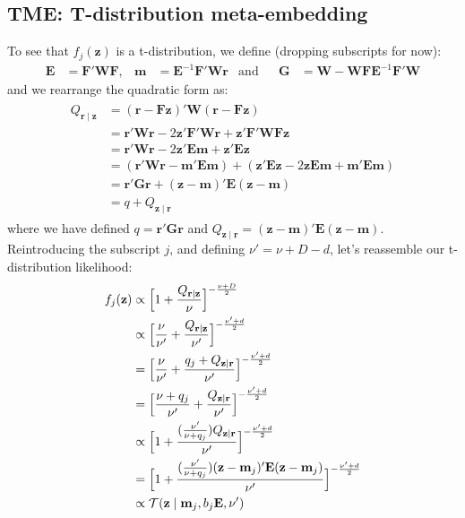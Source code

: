 \documentclass[a4paper,oneside,12pt,english]{report}
\def\zvec{\mathbf{z}}
\def\Wmat{\mathbf{W}}
\def\Fmat{\mathbf{F}}
\def\Gmat{\mathbf{G}}
\def\Emat{\mathbf{E}}
\def\Gmat{\mathbf{G}}
\def\mvec{\mathbf{m}}
\def\rvec{\mathbf{r}}
\begin{document}
\subsection{TME: T-distribution meta-embedding}
To see that $f_j(\zvec)$ is a t-distribution, we define (dropping subscripts for now): 
\begin{align}
\label{eq:defBmuG}
\Emat &= \Fmat'\Wmat\Fmat,& \mvec &= \Emat^{-1}\Fmat'\Wmat\rvec& \text{and} && \Gmat &= \Wmat-\Wmat\Fmat\Emat^{-1}\Fmat'\Wmat 
\end{align}
and we rearrange the quadratic form as:
\begin{align}
\label{eq:rearrangeQ}
\begin{split}
Q_{\rvec\mid\zvec} &= (\rvec-\Fmat\zvec)'\Wmat(\rvec-\Fmat\zvec)\\ 
&= \rvec'\Wmat\rvec -2\zvec'\Fmat'\Wmat\rvec + \zvec'\Fmat'\Wmat\Fmat\zvec \\
&= \rvec'\Wmat\rvec -2\zvec'\Emat\mvec + \zvec'\Emat\zvec \\
&= (\rvec'\Wmat\rvec -\mvec'\Emat\mvec) + (\zvec'\Emat\zvec -2\zvec\Emat\mvec + \mvec'\Emat\mvec) \\
&= \rvec'\Gmat\rvec + (\zvec-\mvec)'\Emat(\zvec-\mvec) \\
&= q + Q_{\zvec\mid\rvec}
\end{split}
\end{align}
where we have defined $q=\rvec'\Gmat\rvec$ and $Q_{\zvec\mid\rvec}=(\zvec-\mvec)'\Emat(\zvec-\mvec)$. Reintroducing the subscript $j$, and defining $\nu'=\nu+D-d$, let's reassemble our t-distribution likelihood:
\begin{align}
\label{eq:TME}
\begin{split}
f_j(\zvec) &\propto \Bigl[1+\frac{Q_{\rvec\mid\zvec}}{\nu}\Bigr]^{-\frac{\nu+D}{2}} \\
&\propto\Bigl[\frac{\nu}{\nu'}+\frac{Q_{\rvec\mid\zvec}}{\nu'}\Bigr]^{-\frac{\nu'+d}{2}} \\
&= \Bigl[\frac{\nu}{\nu'}+\frac{q_j + Q_{\zvec\mid\rvec}}{\nu'}\Bigr]^{-\frac{\nu'+d}{2}} \\
&= \Bigl[\frac{\nu+q_j}{\nu'} + \frac{Q_{\zvec\mid\rvec}}{\nu'}\Bigr]^{-\frac{\nu'+d}{2}} \\
&\propto \Bigl[1 + \frac{(\frac{\nu'}{\nu+q_j})Q_{\zvec\mid\rvec}}{\nu'}\Bigr]^{-\frac{\nu'+d}{2}} \\
&= \Bigl[1 + \frac{(\frac{\nu'}{\nu+q_j})(\zvec-\mvec_j)'\Emat(\zvec-\mvec_j)}{\nu'}\Bigr]^{-\frac{\nu'+d}{2}} \\
&\propto\TD(\zvec\mid \mvec_j,b_j\Emat,\nu')
\end{split}
\end{align}
\end{document}
